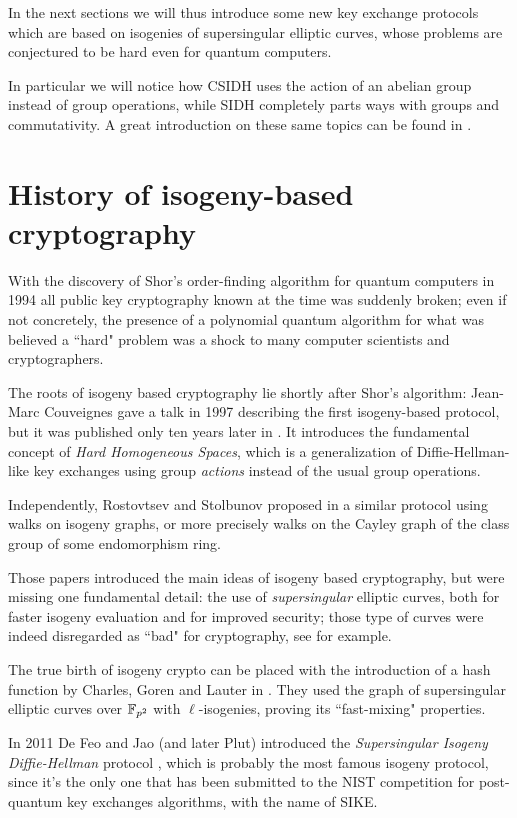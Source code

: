 In the next sections we will thus introduce some new key exchange protocols which are based on isogenies of supersingular elliptic curves, whose problems are conjectured to be hard even for quantum computers.

In particular we will notice how CSIDH uses the action of an abelian group instead of group operations, while SIDH completely parts ways with groups and commutativity. A great introduction on these same topics can be found in \cite{Smith_DH}.


\section{History of isogeny-based cryptography}
With the discovery of Shor's order-finding algorithm for quantum computers in 1994 all public key cryptography known at the time was suddenly broken; even if not concretely, the presence of a polynomial quantum algorithm for what was believed a ``hard" problem was a shock to many computer scientists and cryptographers.

The roots of isogeny based cryptography lie shortly after Shor's algorithm: Jean-Marc Couveignes gave a talk in 1997 describing the first isogeny-based protocol, but it was published only ten years later in \cite{Couveignes}. It introduces the fundamental concept of \emph{Hard Homogeneous Spaces}, which is a generalization of Diffie-Hellman-like key exchanges using group \emph{actions} instead of the usual group operations.

Independently, Rostovtsev and Stolbunov proposed in \cite{Rostovtsev} a similar protocol using walks on isogeny graphs, or more precisely walks on the Cayley graph of the class group of some endomorphism ring.

Those papers introduced the main ideas of isogeny based cryptography, but were missing one fundamental detail: the use of \emph{supersingular} elliptic curves, both for faster isogeny evaluation and for improved security; those type of curves were indeed disregarded as ``bad" for cryptography, see \cite{Galbraith_sscurves} for example.

The true birth of isogeny crypto can be placed with the introduction of a hash function by Charles, Goren and Lauter in \cite{CGL}. They used the graph of supersingular elliptic curves over $\mathbb{F}_{p^2}$ with $\ell$-isogenies, proving its ``fast-mixing" properties.

In 2011 De Feo and Jao (and later Plut) introduced the \emph{Supersingular Isogeny Diffie-Hellman} protocol \cite{SIDH11}, which is probably the most famous isogeny protocol, since it's the only one that has been submitted to the NIST competition for post-quantum key exchanges algorithms, with the name of SIKE.

